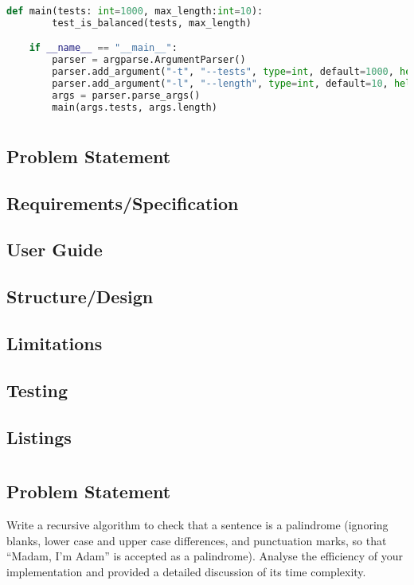 \documentclass{report}
\begin{document}
\begin{lstlisting}[language=Python]
	def main(tests: int=1000, max_length:int=10):
		test_is_balanced(tests, max_length)

	if __name__ == "__main__":
		parser = argparse.ArgumentParser()
		parser.add_argument("-t", "--tests", type=int, default=1000, help="number of tests to run")
		parser.add_argument("-l", "--length", type=int, default=10, help="maximum length of the statement")
		args = parser.parse_args()
		main(args.tests, args.length)
\end{lstlisting}
\chapter{}
\section{Problem Statement}
\section{Requirements/Specification}
\section{User Guide}
\section{Structure/Design}
\section{Limitations}
\section{Testing}
\section{Listings}
\chapter{}
\section{Problem Statement}
Write a recursive algorithm to check that a sentence is a palindrome (ignoring blanks, lower case and upper case differences, and punctuation marks, so that ``Madam, I'm Adam'' is accepted as a palindrome). Analyse the efficiency of your implementation and provided a detailed discussion of its time complexity.
\end{document}
